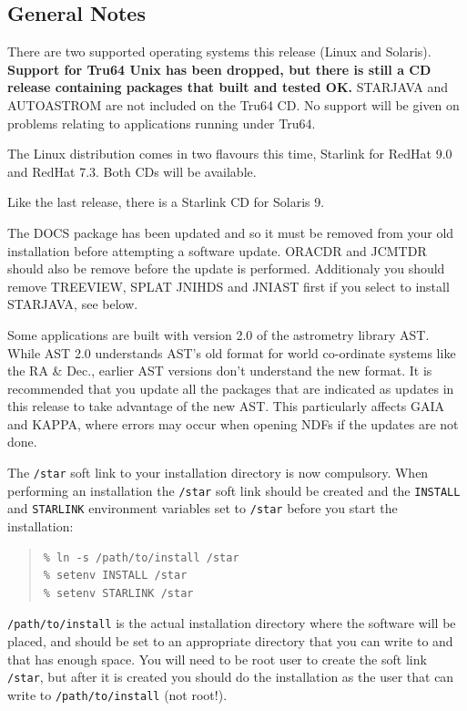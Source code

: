 \documentclass[twoside,11pt]{article}
\newcommand{\xlabel}[1]{}
\renewcommand{\_}{\texttt{\symbol{95}}}
\begin{document}
\subsection{\xlabel{General Notes}General Notes}

There are two supported operating systems this release (Linux and Solaris).
\textbf{Support for Tru64 Unix has been dropped, but there is still a CD release
containing packages that built and tested OK.} STARJAVA and AUTOASTROM are
not included on the Tru64 CD. No support will be given on problems relating
to applications running under Tru64.

The Linux distribution comes in two flavours this time, Starlink for
RedHat 9.0 and RedHat 7.3. Both CDs will be available.

Like the last release, there is a Starlink CD for Solaris 9.

The DOCS package has been updated and so it must be removed from
your old installation before attempting a software update. ORACDR and
JCMTDR should also be remove before the update is performed. Additionaly
you should remove TREEVIEW, SPLAT JNIHDS and JNIAST first if you select to
install STARJAVA, see below.

Some applications are built with version 2.0 of the astrometry
library AST. While AST 2.0 understands AST's old format for world
co-ordinate systems like the RA \& Dec., earlier AST versions don't
understand the new format. It is recommended that you update all the
packages that are indicated as updates in this release to take advantage
of the new AST. This particularly affects GAIA and KAPPA, where errors
may occur when opening NDFs if the updates are not done.

The \texttt{/star} soft link to your installation directory is now
compulsory. When performing an installation the \texttt{/star}
soft link should be created and the \texttt{INSTALL} and
\texttt{STARLINK} environment variables set to \texttt{/star} before you
start the installation:

\begin{quote}
\begin{verbatim}
% ln -s /path/to/install /star
% setenv INSTALL /star
% setenv STARLINK /star
\end{verbatim}
\end{quote}

\texttt{/path/to/install} is the actual installation directory where
the software will be placed, and should be set to an appropriate
directory that you can write to and that has enough space. You will
need to be root user to create the soft link \texttt{/star}, but after it is
created you should do the installation as the user that can write
to \texttt{/path/to/install} (not root!).
\end{document}
